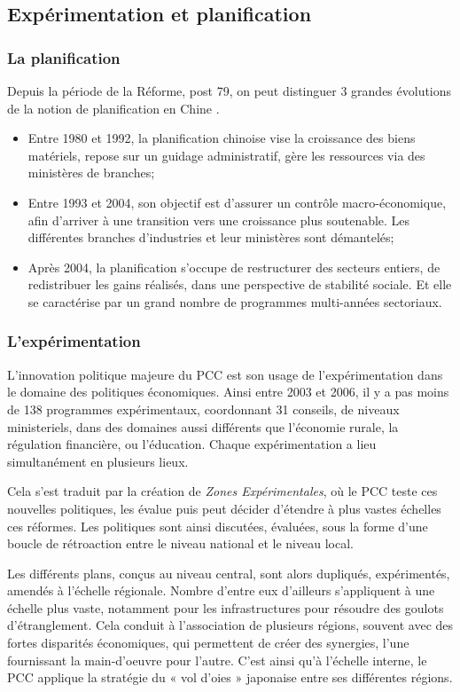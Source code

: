 \documentclass[a4paper]{article}
\begin{document}
\subsection{Expérimentation et planification}
\label{sec:org4828e82}
\subsubsection{La planification}
\label{sec:org7c0e0d7}
Depuis la période de la Réforme, post 79, on peut distinguer 3 grandes évolutions de la notion de planification en Chine \cite{heilmann18_red}.

\begin{itemize}
\item Entre 1980 et 1992, la planification chinoise vise la croissance des biens matériels, repose sur un guidage administratif, gère les ressources via des ministères de branches;
\item Entre 1993 et 2004, son objectif est d’assurer un contrôle macro-éco\-no\-mi\-que, afin d’arriver à une transition vers une croissance plus soutenable. Les différentes branches d’industries et leur ministères sont démantelés;
\item Après 2004, la planification s’occupe de restructurer des secteurs entiers, de redistribuer les gains réalisés, dans une perspective de stabilité sociale. Et elle se caractérise par un grand nombre de programmes multi-années sectoriaux.
\end{itemize}
\subsubsection{L’expérimentation}
\label{sec:orgcd915f5}
L’innovation politique majeure du PCC est son usage de l’expérimentation dans le domaine des politiques économiques. Ainsi entre 2003 et 2006, il y a pas moins de 138 programmes expérimentaux, coordonnant 31 conseils, de niveaux ministeriels, dans des domaines aussi différents que l’économie rurale, la régulation financière, ou l’éducation. Chaque expérimentation a lieu simultanément en plusieurs lieux.

Cela s’est traduit par la création de \textit{Zones Expérimentales}, où le PCC teste ces nouvelles politiques, les évalue puis peut décider d’étendre à plus vastes échelles ces réformes. Les politiques sont ainsi discutées, évaluées, sous la forme d’une boucle de rétroaction entre le niveau national et le niveau local.

Les différents plans, conçus au niveau central, sont alors dupliqués, expérimentés, amendés à l’échelle régionale. Nombre d’entre eux d’ailleurs s’ap\-pli\-quent à une échelle plus vaste, notamment pour les infrastructures pour résoudre des goulots d’étranglement. Cela conduit à l’association de plusieurs régions, souvent avec des fortes disparités économiques, qui permettent de créer des synergies, l’une fournissant la main-d’oeuvre pour l’autre. C’est ainsi qu’à l’échelle interne, le PCC applique la stratégie du « vol d’oies » japonaise entre ses différentes régions.
\end{document}
